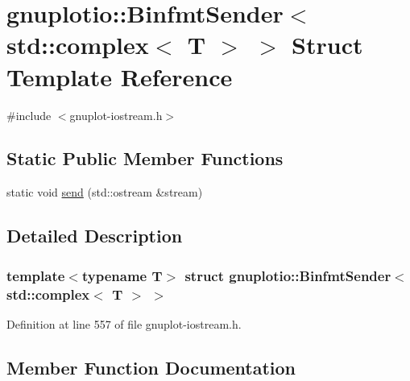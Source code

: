 \hypertarget{structgnuplotio_1_1_binfmt_sender_3_01std_1_1complex_3_01_t_01_4_01_4}{}\section{gnuplotio\+:\+:Binfmt\+Sender$<$ std\+:\+:complex$<$ T $>$ $>$ Struct Template Reference}
\label{structgnuplotio_1_1_binfmt_sender_3_01std_1_1complex_3_01_t_01_4_01_4}


{\ttfamily \#include $<$gnuplot-\/iostream.\+h$>$}

\subsection*{Static Public Member Functions}
\begin{DoxyCompactItemize}
\item 
static void \hyperlink{structgnuplotio_1_1_binfmt_sender_3_01std_1_1complex_3_01_t_01_4_01_4_a64633d068c93ef2822ee3aa6ef39d623}{send} (std\+::ostream \&stream)
\end{DoxyCompactItemize}


\subsection{Detailed Description}
\subsubsection*{template$<$typename T$>$\newline
struct gnuplotio\+::\+Binfmt\+Sender$<$ std\+::complex$<$ T $>$ $>$}



Definition at line 557 of file gnuplot-\/iostream.\+h.



\subsection{Member Function Documentation}
\mbox{\label{structgnuplotio_1_1_binfmt_sender_3_01std_1_1complex_3_01_t_01_4_01_4_a64633d068c93ef2822ee3aa6ef39d623}} 
